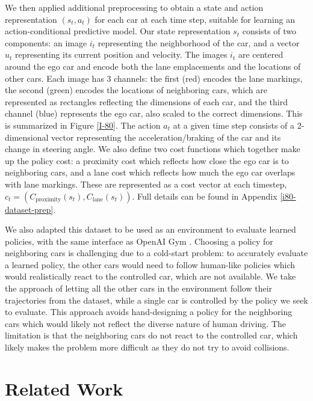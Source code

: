 \documentclass{article} %
\begin{document}
We then applied additional preprocessing to obtain a state and action representation $(s_t, a_t)$ for each car at each time step, suitable for learning an action-conditional predictive model.
Our state representation $s_t$ consists of two components: an image $i_t$ representing the neighborhood of the car, and a vector $u_t$ representing its current position and velocity.
The images $i_t$ are centered around the ego car and encode both the lane emplacements and the locations of other cars.
Each image has 3 channels: the first (red) encodes the lane markings, the second (green) encodes the locations of neighboring cars, which are represented as rectangles reflecting the dimensions of each car, and the third channel (blue) represents the ego car, also scaled to the correct dimensions.
This is summarized in Figure \ref{I-80}. The action $a_t$ at a given time step consists of a 2-dimensional vector representing the acceleration/braking of the car and its change in steering angle.
We also define two cost functions which together make up the policy cost: a proximity cost which reflects how close the ego car is to neighboring cars, and a lane cost which reflects how much the ego car overlaps with lane markings. These are represented as a cost vector at each timestep, $c_t = (C_{\text{proximity}}(s_t), C_{\text{lane}}(s_t))$. Full details can be found in Appendix \ref{i80-dataset-prep}.


We also adapted this dataset to be used as an environment to evaluate learned policies, with the same interface as OpenAI Gym \citep{OpenAIBaselines}.
Choosing a policy for neighboring cars is challenging due to a cold-start problem: to accurately evaluate a learned policy, the other cars would need to follow human-like policies which would realistically react to the controlled car, which are not available.
We take the approach of letting all the other cars in the environment follow their trajectories from the dataset, while a single car is controlled by the policy we seek to evaluate.
This approach avoids hand-designing a policy for the neighboring cars which would likely not reflect the diverse nature of human driving.
The limitation is that the neighboring cars do not react to the controlled car, which likely makes the problem more difficult as they do not try to avoid collisions.


\section{Related Work}
\end{document}
